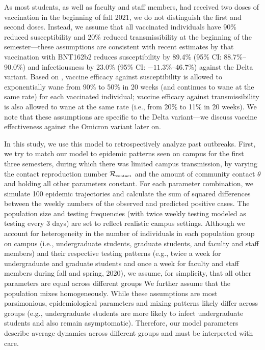 \documentclass[12pt]{article}
\newcommand{\Rx}[1]{\ensuremath{{\mathcal R}_{#1}}}
\newcommand{\Rc}{\Rx{\textrm{\tiny{contact}}}}
\begin{document}
As most students, as well as faculty and staff members, had received two doses of vaccination in the beginning of fall 2021, we do not distinguish the first and second doses.
Instead, we assume that all vaccinated individuals have 90\% reduced susceptibility and 20\% reduced transmissibility at the beginning of the semester---these assumptions are consistent with recent estimates by \cite{prunas2022vaccination} that vaccination with BNT162b2 reduces susceptibility by 89.4\% (95\% CI: 88.7\%--90.0\%) and infectiousness by 23.0\% (95\% CI: $-11.3\%$--46.7\%) against the Delta variant.
Based on \cite{tartof2021effectiveness}, vaccine efficacy against susceptibility is allowed to exponentially wane from 90\% to 50\% in 20 weeks (and continues to wane at the same rate) for each vaccinated individual;
vaccine efficacy against transmissibility is also allowed to wane at the same rate (i.e., from 20\% to 11\% in 20 weeks).
We note that these assumptions are specific to the Delta variant---we discuss vaccine effectiveness against the Omicron variant later on.

In this study, we use this model to retrospectively analyze past outbreaks.
First, we try to match our model to epidemic patterns seen on campus for the first three semesters, during which there was limited campus transmission, by varying the contact reproduction number $\Rc$ and the amount of community contact $\theta$ and holding all other parameters constant.
For each parameter combination, we simulate 100 epidemic trajectories and calculate the sum of squared differences between the weekly numbers of the observed and predicted positive cases.
The population size and testing frequencies (with twice weekly testing modeled as testing every 3 days) are set to reflect realistic campus settings.
Although we account for heterogeneity in the number of individuals in each population group on campus (i.e., undergraduate students, graduate students, and faculty and staff members) and their respective testing patterns (e.g., twice a week for undergraduate and graduate students and once a week for faculty and staff members during fall and spring, 2020), we assume, for simplicity, that all other parameters are equal across different groups 
We further assume that the population mixes homogeneously.
While these assumptions are most parsimonious, epidemiological parameters and mixing patterns likely differ across groups (e.g., undergraduate students are more likely to infect undergraduate students and also remain asymptomatic).
Therefore, our model parameters describe average dynamics across different groups and must be interpreted with care.
\end{document}
